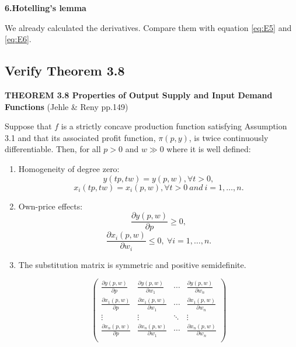 \documentclass{article}
\begin{document}
\vspace{3mm}
\textbf{6.Hotelling's lemma}

We already calculated the derivatives. Compare them with equation \ref{eq:E5} and \ref{eq:E6}.
\subsection{Verify Theorem 3.8}

\begin{mdframed}[backgroundcolor=blue!20,linecolor=white]

\textbf{THEOREM 3.8 Properties of Output Supply and Input Demand Functions} (Jehle \& Reny pp.149)

Suppose that $f$ is a strictly concave production function satisfying Assumption 3.1 and that its associated profit function, $\pi(p, y)$, is twice continuously differentiable. Then, for all $p > 0$ and $w \gg 0$ where it is well defined:

\begin{enumerate}

\item Homogeneity of degree zero:
$$y(tp,tw) = y (p,w), \forall t > 0,$$
$$x_i(tp,tw) = x_i(p,w), \forall t > 0 \ and \  i = 1,\dots, n.$$
\item Own-price effects:
$$\frac{\partial y(p,w)}{\partial p} \ge 0,$$
$$\frac{\partial x_i(p,w)}{\partial w_i} \le 0, \ \forall i = 1,\dots, n. $$

\item The substitution matrix is symmetric and positive semidefinite.

\begin{equation}
\left(
    \begin{array}{cccc}
    \frac{\partial y(p,w)}{\partial p} & \frac{\partial y(p,w)}{\partial w_1} & \cdots & \frac{\partial y(p,w)}{\partial w_n} \\
    \frac{\partial x_1(p,w)}{\partial p} & \frac{\partial x_1(p,w)}{\partial w_1} & \cdots & \frac{\partial x_1(p,w)}{\partial w_n} \\
    \vdots    &    \vdots & \ddots &   \vdots \\
    \frac{\partial x_n(p,w)}{\partial p} & \frac{\partial x_n(p,w)}{\partial w_1} & \cdots & \frac{\partial x_n(p,w)}{\partial w_n} \\
    \end{array}
    \right)
\label{eq:subst}   
\end{equation}
\end{enumerate}
\end{mdframed}
\end{document}
